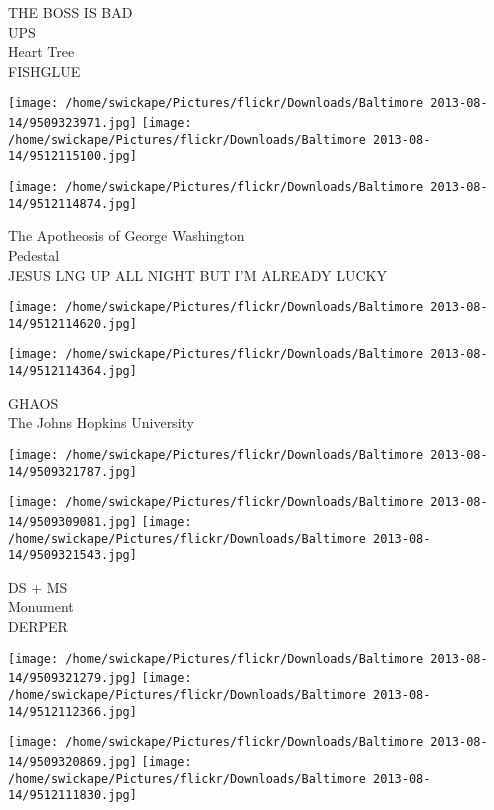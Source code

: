 \documentclass[10pt,letterpaper]{article}
\begin{document}
THE BOSS IS BAD\\
UPS\\
Heart Tree\\
FISHGLUE\\
\pagebreak

\texttt{[image: /home/swickape/Pictures/flickr/Downloads/Baltimore 2013-08-14/9509323971.jpg]}
\texttt{[image: /home/swickape/Pictures/flickr/Downloads/Baltimore 2013-08-14/9512115100.jpg]}

\texttt{[image: /home/swickape/Pictures/flickr/Downloads/Baltimore 2013-08-14/9512114874.jpg]}

The Apotheosis of George Washington\\
Pedestal\\
JESUS LNG UP ALL NIGHT BUT I'M ALREADY LUCKY\\
\pagebreak

\texttt{[image: /home/swickape/Pictures/flickr/Downloads/Baltimore 2013-08-14/9512114620.jpg]}

\vspace{0.25in}
\texttt{[image: /home/swickape/Pictures/flickr/Downloads/Baltimore 2013-08-14/9512114364.jpg]}

GHAOS\\
The Johns Hopkins University\\
\pagebreak

\texttt{[image: /home/swickape/Pictures/flickr/Downloads/Baltimore 2013-08-14/9509321787.jpg]}

\vspace{0.25in}
\texttt{[image: /home/swickape/Pictures/flickr/Downloads/Baltimore 2013-08-14/9509309081.jpg]}
\texttt{[image: /home/swickape/Pictures/flickr/Downloads/Baltimore 2013-08-14/9509321543.jpg]}

DS + MS\\
Monument\\
DERPER\\
\pagebreak

\texttt{[image: /home/swickape/Pictures/flickr/Downloads/Baltimore 2013-08-14/9509321279.jpg]}
\texttt{[image: /home/swickape/Pictures/flickr/Downloads/Baltimore 2013-08-14/9512112366.jpg]}

\texttt{[image: /home/swickape/Pictures/flickr/Downloads/Baltimore 2013-08-14/9509320869.jpg]}
\texttt{[image: /home/swickape/Pictures/flickr/Downloads/Baltimore 2013-08-14/9512111830.jpg]}
\end{document}
